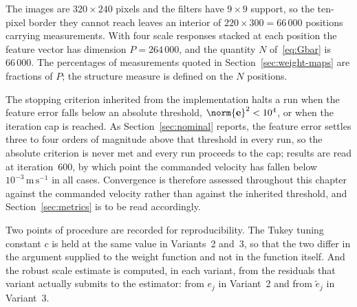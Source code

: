The images are $320\times240$ pixels and the filters have $9\times9$ support,
so the ten-pixel border they cannot reach leaves an interior of
$220\times300=66\,000$ positions carrying measurements. With four scale
responses stacked at each position the feature vector has dimension
$P=264\,000$, and the quantity $N$ of~\eqref{eq:Gbar} is $66\,000$. The
percentages of measurements quoted in Section~\ref{sec:weight-maps} are
fractions of $P$; the structure measure is defined on the $N$ positions.

The stopping criterion inherited from the implementation halts a run when the
feature error falls below an absolute threshold,
$\norm{\mathbf{e}}^{2}<10^{4}$, or when the iteration cap is reached. As
Section~\ref{sec:nominal} reports, the feature error settles three to four
orders of magnitude above that threshold in every run, so the absolute
criterion is never met and every run proceeds to the cap; results are read at
iteration~600, by which point the commanded velocity has fallen below
$10^{-3}\,\mathrm{m\,s^{-1}}$ in all cases. Convergence is therefore assessed
throughout this chapter against the commanded velocity rather than against the
inherited threshold, and Section~\ref{sec:metrics} is to be read accordingly.

Two points of procedure are recorded for reproducibility. The Tukey tuning
constant $c$ is held at the same value in Variants~2 and~3, so that the two
differ in the argument supplied to the weight function and not in the function
itself. And the robust scale estimate is computed, in each variant, from the
residuals that variant actually submits to the estimator: from $e_{j}$ in
Variant~2 and from $\tilde{e}_{j}$ in Variant~3.

